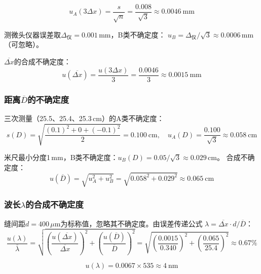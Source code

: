 \documentclass[12pt, a4paper]{article}
\begin{document}
\begin{equation}
  u_A(3\Delta x) = \frac{s}{\sqrt{n}} = \frac{0.008}{\sqrt{3}} \approx 0.0046\ \text{mm}
\end{equation}

测微头仪器误差取$\Delta_\text{仪} = 0.001$\,mm，B类不确定度：
$u_B = \Delta_\text{仪}/\sqrt{3} \approx 0.0006$\,mm（可忽略）。

$\overline{\Delta x}$的合成不确定度：
\begin{equation}
  u(\overline{\Delta x}) = \frac{u(3\Delta x)}{3} = \frac{0.0046}{3} \approx 0.0015\ \text{mm}
\end{equation}

\subsubsection{距离$\overline{D}$的不确定度}

三次测量（25.5、25.4、25.3\,cm）的A类不确定度：
\begin{equation}
  s(D) = \sqrt{\frac{(0.1)^2 + 0 + (-0.1)^2}{2}} = 0.100\ \text{cm}, \quad
  u_A(D) = \frac{0.100}{\sqrt{3}} \approx 0.058\ \text{cm}
\end{equation}

米尺最小分度1\,mm，B类不确定度：$u_B(D) = 0.05/\sqrt{3} \approx 0.029$\,cm。
合成不确定度：
\begin{equation}
  u(\overline{D}) = \sqrt{u_A^2 + u_B^2} = \sqrt{0.058^2 + 0.029^2} \approx 0.065\ \text{cm}
\end{equation}

\subsubsection{波长$\lambda$的合成不确定度}

缝间距$d = 400\,\mu$m为标称值，忽略其不确定度。由误差传递公式
$\lambda = \overline{\Delta x} \cdot d / \overline{D}$：
\begin{equation}
  \frac{u(\lambda)}{\bar{\lambda}}
  = \sqrt{\left(\frac{u(\overline{\Delta x})}{\overline{\Delta x}}\right)^2
         + \left(\frac{u(\overline{D})}{\overline{D}}\right)^2}
  = \sqrt{\left(\frac{0.0015}{0.340}\right)^2 + \left(\frac{0.065}{25.4}\right)^2}
  \approx 0.67\%
\end{equation}

\begin{equation}
  u(\lambda) = 0.0067 \times 535 \approx 4\ \text{nm}
\end{equation}
\end{document}

